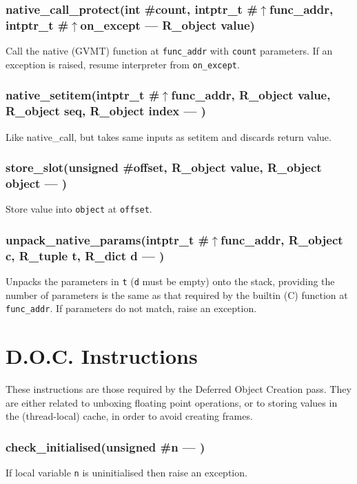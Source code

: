 \subsubsection{native\_call\_protect(int \#count, intptr\_t \#$\uparrow$func\_addr, intptr\_t \#$\uparrow$on\_except --- R\_object value)}
\vspace{-1em}Call the native (GVMT) function at \texttt{func\_addr} with \texttt{count} parameters. If an exception is raised, resume interpreter from \texttt{on\_except}. \vspace{-1em}
\subsubsection{native\_setitem(intptr\_t \#$\uparrow$func\_addr, R\_object value, R\_object seq, R\_object index --- )}
\vspace{-1em}Like native\_call, but takes same inputs as setitem and discards return value. \vspace{-1em}
\subsubsection{store\_slot(unsigned \#offset, R\_object value, R\_object object --- )}
\vspace{-1em}Store value into \texttt{object} at \texttt{offset}. \vspace{-1em}
\subsubsection{unpack\_native\_params(intptr\_t \#$\uparrow$func\_addr, R\_object c, R\_tuple t, R\_dict d --- )}
\vspace{-1em}Unpacks the parameters in \texttt{t} (\texttt{d} must be empty) onto the stack,  providing the number of parameters is the same as that required by the builtin (C) function  at \texttt{func\_addr}. If parameters do not match, raise an exception. \vspace{-1em}
\section{D.O.C. Instructions}

        These instructions are those required by the Deferred Object Creation pass.
        They are either related to unboxing floating point operations, 
        or to storing values in the (thread-local) cache, in order to avoid creating frames.
        
\subsubsection{check\_initialised(unsigned \#n --- )}
\vspace{-1em}If local variable \texttt{n} is uninitialised then raise an exception. \vspace{-1em}
